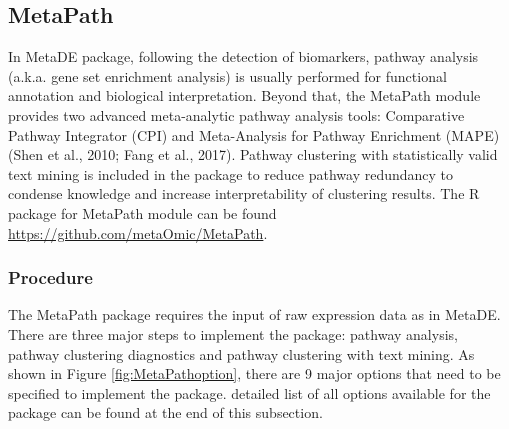\subsection{MetaPath}

In MetaDE package,
following the detection of biomarkers, pathway analysis (a.k.a. gene set enrichment analysis) is usually performed for functional annotation and biological interpretation. 
Beyond that, the MetaPath module provides two advanced meta-analytic pathway analysis tools: 
Comparative Pathway Integrator (CPI) and Meta-Analysis for Pathway Enrichment (MAPE) (Shen et al., 2010; Fang et al., 2017). 
Pathway clustering with statistically valid text mining is included in the package to reduce pathway redundancy to condense knowledge and increase interpretability of clustering results. 
The R package for MetaPath module can be found \url{https://github.com/metaOmic/MetaPath}.

\subsubsection{Procedure}
The MetaPath package requires the input of raw expression data as in MetaDE. 
There are three major steps to implement the package: pathway analysis, pathway clustering diagnostics and pathway clustering with text mining. 
As shown in Figure \ref{fig:MetaPathoption}, there are 9 major options that need to be specified to implement the package.
 detailed list of all options available for the package can be found at the end of this subsection. 


